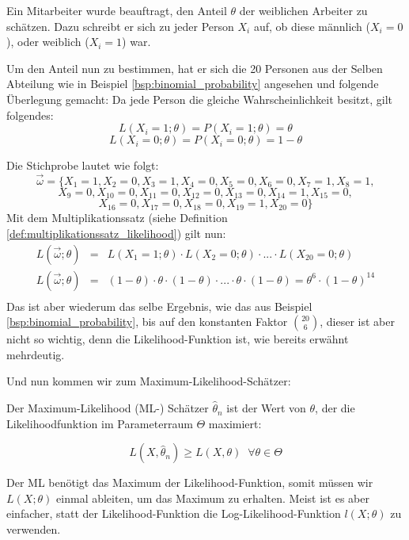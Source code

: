 \begin{bsp}\label{bsp:likelihood}
Ein Mitarbeiter wurde beauftragt, den Anteil $\theta$ der weiblichen Arbeiter zu schätzen. Dazu schreibt er sich zu jeder Person $X_i$ auf, ob diese männlich ($X_i=0$), oder weiblich ($X_i=1$) war.

Um den Anteil nun zu bestimmen, hat er sich die 20 Personen aus der Selben Abteilung wie in Beispiel \ref{bsp:binomial_probability} angesehen und folgende Überlegung gemacht:
Da jede Person die gleiche Wahrscheinlichkeit besitzt, gilt folgendes:
\[L(X_i=1;\theta)=P(X_i=1;\theta)=\theta\]
\[L(X_i=0;\theta)=P(X_i=0;\theta)=1-\theta\]

Die Stichprobe lautet wie folgt: \[\vec\omega = \{X_1=1, X_2=0, X_3=1, X_4=0,X_5=0,X_6=0,X_7=1,X_8=1,\]
    \[X_9=0,X_{10}=0,X_{11}=0,X_{12}=0,X_{13}=0,X_{14}=1,X_{15}=0,\]
    \[X_{16}=0,X_{17}=0,X_{18}=0,X_{19}=1,X_{20}=0\} \]
Mit dem Multiplikationssatz (siehe Definition \ref{def:multiplikationssatz_likelihood}) gilt nun:
\begin{eqnarray*}
L(\vec\omega;\theta)&=&L(X_1=1;\theta)\cdot L(X_2=0;\theta)\cdot ...\cdot L(X_{20}=0;\theta)\\
L(\vec\omega;\theta)&=&(1-\theta)\cdot \theta \cdot (1-\theta)\cdot ... \cdot \theta \cdot (1-\theta)=\theta^6\cdot(1-\theta)^{14}\\
\end{eqnarray*}
Das ist aber wiederum das selbe Ergebnis, wie das aus Beispiel \ref{bsp:binomial_probability}, bis auf den konstanten Faktor $\binom{20}{6}$, dieser ist aber nicht so wichtig, denn die Likelihood-Funktion ist, wie bereits erwähnt mehrdeutig.
\end{bsp}


Und nun kommen wir zum Maximum-Likelihood-Schätzer:

\begin{definition}
Der Maximum-Likelihood (ML-) Schätzer $\hat\theta_n$ ist der Wert von $\theta$, der die Likelihoodfunktion im Parameterraum $\Theta$ maximiert:

\[L(X,\hat\theta_n)\geq L(X,\theta)\;\;\forall \theta\in\Theta\]
\end{definition}

Der ML benötigt das Maximum der Likelihood-Funktion, somit müssen wir $L(X;\theta)$ einmal ableiten, um das Maximum zu erhalten.
Meist ist es aber einfacher, statt der Likelihood-Funktion die Log-Likelihood-Funktion $l(X;\theta)$ zu verwenden.

